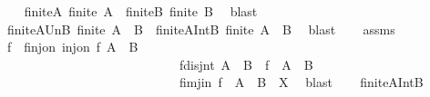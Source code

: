 \begin{isabellebody}
\ \ \isamarkupfalse%
\ finite{\isacharunderscore}{\kern0pt}A{\isacharcolon}{\kern0pt}\ {\isachardoublequoteopen}finite\ A{\isachardoublequoteclose}\ \ finite{\isacharunderscore}{\kern0pt}B{\isacharcolon}{\kern0pt}\ {\isachardoublequoteopen}finite\ B{\isachardoublequoteclose}\ \isamarkupfalse%
\ blast{\isacharplus}{\kern0pt}\isanewline
\ \ \isamarkupfalse%
\ \isamarkupfalse%
\ finite{\isacharunderscore}{\kern0pt}A{\isacharunderscore}{\kern0pt}Un{\isacharunderscore}{\kern0pt}B{\isacharcolon}{\kern0pt}\ {\isachardoublequoteopen}finite\ {\isacharparenleft}{\kern0pt}A\ {\isasymunion}\ B{\isacharparenright}{\kern0pt}{\isachardoublequoteclose}\ \ finite{\isacharunderscore}{\kern0pt}A{\isacharunderscore}{\kern0pt}Int{\isacharunderscore}{\kern0pt}B{\isacharcolon}{\kern0pt}\ {\isachardoublequoteopen}finite\ {\isacharparenleft}{\kern0pt}A\ {\isasyminter}\ B{\isacharparenright}{\kern0pt}{\isachardoublequoteclose}\ \isamarkupfalse%
\ blast{\isacharplus}{\kern0pt}\isanewline
\ \ \isamarkupfalse%
\ assms{\isacharparenleft}{\kern0pt}{}{\isacharparenright}{\kern0pt}\ \isamarkupfalse%
\ f\ \ f{\isacharunderscore}{\kern0pt}inj{\isacharunderscore}{\kern0pt}on{\isacharcolon}{\kern0pt}\ {\isachardoublequoteopen}inj{\isacharunderscore}{\kern0pt}on\ f\ {\isacharparenleft}{\kern0pt}A\ {\isasyminter}\ B{\isacharparenright}{\kern0pt}{\isachardoublequoteclose}\ \isanewline
\ \ \ \ \ \ \ \ \ \ \ \ \ \ \ \ \ \ \ \ \ \ \ \ \ \ \ \ f{\isacharunderscore}{\kern0pt}disjnt{\isacharcolon}{\kern0pt}\ {\isachardoublequoteopen}{\isacharparenleft}{\kern0pt}A\ {\isasymunion}\ B{\isacharparenright}{\kern0pt}\ {\isasyminter}\ {\isacharparenleft}{\kern0pt}f\ {\isacharbackquote}{\kern0pt}\ {\isacharparenleft}{\kern0pt}A\ {\isasyminter}\ B{\isacharparenright}{\kern0pt}{\isacharparenright}{\kern0pt}\ {\isacharequal}{\kern0pt}\ {\isacharbraceleft}{\kern0pt}{\isacharbraceright}{\kern0pt}{\isachardoublequoteclose}\ \isanewline
\ \ \ \ \ \ \ \ \ \ \ \ \ \ \ \ \ \ \ \ \ \ \ \ \ \ \ \ f{\isacharunderscore}{\kern0pt}imj{\isacharunderscore}{\kern0pt}in{\isacharcolon}{\kern0pt}\ {\isachardoublequoteopen}f\ {\isacharbackquote}{\kern0pt}\ {\isacharparenleft}{\kern0pt}A\ {\isasyminter}\ B{\isacharparenright}{\kern0pt}\ {\isasymsubseteq}\ X{\isachardoublequoteclose}\ \isamarkupfalse%
\ blast\isanewline
\ \ \isamarkupfalse%
\ finite{\isacharunderscore}{\kern0pt}A{\isacharunderscore}{\kern0pt}Int{\isacharunderscore}{\kern0pt}B\ \isamarkupfalse%

\end{isabellebody}

